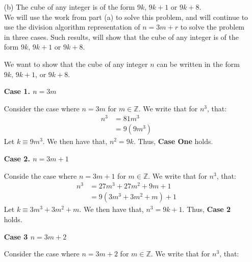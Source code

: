 \documentclass[10pt,oneside]{book}
\newcommand{\Z}{\mathbb{Z}}\newcommand{\R}{\mathbb{R}}\newcommand{\N}{\mathbb{N}}
\newcommand{\en}{\vspace{0.25cm}\\}
\newcommand{\centerit}[1]{{\begin{center} #1 \end{center}}}
\let\endoldproof\endproof
\renewenvironment{proof}[1][\proofname]
  {\vspace{0.2cm}\begin{adjustwidth}{2em}{2em}
   \oldproof[#1]}
  {\endoldproof
   \end{adjustwidth}}
\begin{document}
\begin{enumerate}
\begin{enumerate}
\begin{proof}
			\pagebreak
			\centerit{\textbf{Case 2. $n = 3m + 1$}}
			Conside the case where $n = 3m+1$ for $m\in \Z$. We write that for $n^2$, that:
			\begin{align*}
				n^2 &= 9m^2 + 6m + 1\\
				&= 3(3m^2 + 2m) + 1
			\end{align*}
			Let $k \equiv 3m^2 + 2m$. We then have that, $n^2 = 3k +1$. Thus, \textbf{Case 2} holds.
			\centerit{\textbf{Case 3 $n = 3m + 2$}}
			Consider the case wherE $n = 3m+ 2$ for $m\in \Z$. We write that for $n^2$, that:
			\begin{align*}
				n^2 &= 9m^2 + 12m + 4\\
				&= 3(3m^2 + 4m) + 3 + 1\\
				&= 3(3m^2 + 4m + 1) + 1
			\end{align*}
			Let $k\equiv 3m^2 + 4m + 1$. We then have that $n^2 = 3k + 1$. Thus, \textbf{Case 3} holds.\en
			Hence, because all three cases hold, $n^2$ can always be written as $n = 3k$ or $n = 3k+1$ for $k\in \Z$. 
		\end{proof}
		\item [(b)] The cube of any integer is of the form $9k,\, 9k + 1$ or $9k + 8$.\en
		We will use the work from part (a) to solve this problem, and will continue to use the division algorithm representation of $n = 3m + r$ to solve the problem in three cases. Such results, will show that the cube of any integer is of the form $9k,\, 9k + 1$ or $9k + 8$.
		\begin{proof}
			We want to show that the cube of any integer $n$ can be written in the form $9k,\, 9k+1$, or $9k + 8$.
			\centerit{\textbf{Case 1. $n = 3m$}}
			Consider the case where $n = 3m$ for $m\in\Z$. We write that for $n^3$, that:
			\begin{align*}
				n^3 &= 81m^3\\
				&= 9(9m^3)
			\end{align*}
			Let $k \equiv 9m^3$. We then have that, $n^2 = 9k$. Thus, \textbf{Case One} holds.
			\pagebreak
			\centerit{\textbf{Case 2. $n = 3m + 1$}}
			Conside the case where $n = 3m+1$ for $m\in \Z$. We write that for $n^3$, that:
			\begin{align*}
				n^3 &= 27m^3 + 27m^2 + 9m +1\\
				&= 9(3m^3 + 3m^2 + m) + 1
			\end{align*}
			Let $k \equiv 3m^3 + 3m^2 + m$. We then have that, $n^3 = 9k +1$. Thus, \textbf{Case 2} holds.
			\centerit{\textbf{Case 3 $n = 3m + 2$}}
			Consider the case where $n = 3m+ 2$ for $m\in \Z$. We write that for $n^3$, that:

\end{proof}
\end{enumerate}
\end{enumerate}
\end{document}
